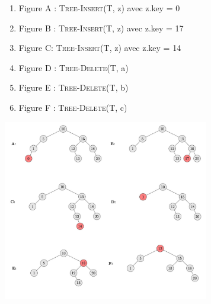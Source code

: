 \begin{Exercice}[20 minutes]
	\begin{solution}
			\begin{enumerate}
				\item Figure A : \textsc{Tree-Insert}(T, z) avec z.key = 0
				\item Figure B : \textsc{Tree-Insert}(T, z) avec z.key = 17
				\item Figure C: \textsc{Tree-Insert}(T, z) avec z.key = 14
				\item Figure D : \textsc{Tree-Delete}(T, a)
				\item Figure E : \textsc{Tree-Delete}(T, b)
				\item Figure F : \textsc{Tree-Delete}(T, c)
			\end{enumerate}
		\centering
		\includegraphics[width=9cm]{solutions/tree_merged.jpg}
	\end{solution}
		
\end{Exercice}

